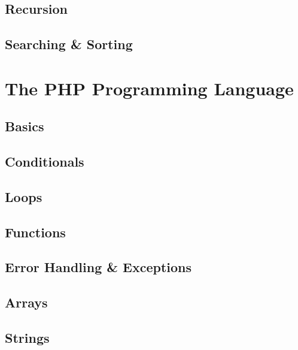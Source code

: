 \documentclass[12pt]{scrbook}
\begin{document}
\chapter{Recursion}
\label{chapter:java:recursion}


\chapter{Searching \& Sorting}
\label{chapter:java:searchingSorting}


\part{The PHP Programming Language}

\chapter{Basics}


\chapter{Conditionals}


\chapter{Loops}


\chapter{Functions}


\chapter{Error Handling \& Exceptions}
\label{chapter:php:errorHandling}


\chapter{Arrays}
\label{chapter:php:arrays}


\chapter{Strings}
\label{chapter:php:strings}

\end{document}
